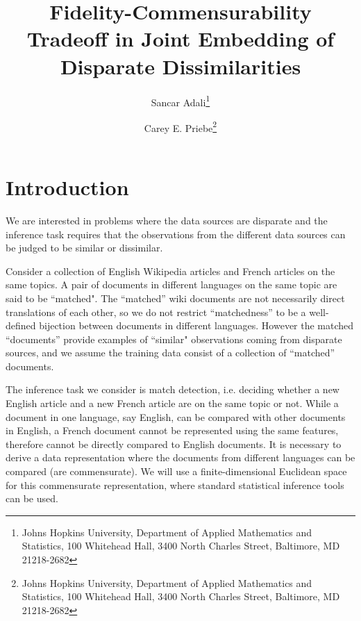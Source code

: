 \documentclass[12pt]{article} %
\title{ Fidelity-Commensurability Tradeoff in Joint Embedding of Disparate Dissimilarities}
\author{Sancar Adali\thanks{Johns Hopkins University,
Department of Applied Mathematics and Statistics,
100 Whitehead Hall,
3400 North Charles Street,
Baltimore, MD 21218-2682} \and Carey E. Priebe\thanks{Johns Hopkins University,
Department of Applied Mathematics and Statistics,
100 Whitehead Hall,
3400 North Charles Street,
Baltimore, MD 21218-2682}
}
\begin{document}
\maketitle
\abstract{
}




\section{Introduction\label{sec:intro}}
  We are interested in problems where the data sources are disparate and the inference task requires that the observations from  the different data sources  can be judged to be similar or dissimilar.
	
	Consider a collection of  English Wikipedia articles  and   French articles on the same topics. A pair of documents in different languages on the same topic are said to be ``matched". The ``matched'' wiki documents are  not necessarily direct translations of each other, so  we do not restrict ``matchedness'' to be a well-defined bijection between documents in different languages.
	However the matched ``documents''  provide examples of  ``similar"  observations coming from disparate sources, and we assume the training data consist of  a collection of ``matched'' documents.
	
  The inference task we consider is match detection, i.e. deciding whether a new English article and a new French article are on the same topic or not. While  a document in one language, say English, can be compared with other documents in English, a  French document  cannot be represented using the same features, therefore cannot be directly compared to English documents.  It is necessary   to derive a data representation  where the  documents from different languages can be compared (are commensurate).  %
	We will use a finite-dimensional Euclidean space for  this commensurate representation, where standard  statistical inference tools can be used.
	
\end{document}
